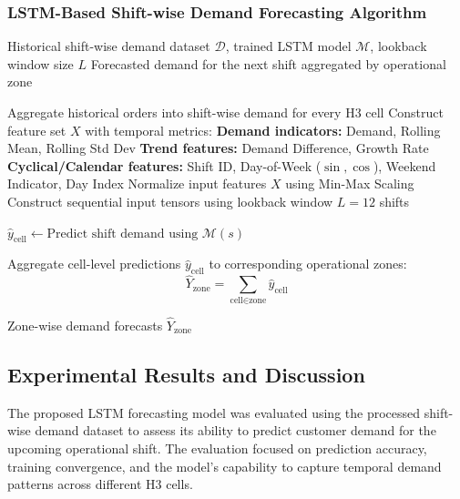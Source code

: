 \documentclass{article}
\begin{document}
\subsubsection{LSTM-Based Shift-wise Demand Forecasting Algorithm}
\begin{algorithm}[H]
\caption{LSTM-Based Shift-Wise Demand Forecasting}
\label{alg:lstm_demand_forecasting}
\begin{algorithmic}[1]
\Require Historical shift-wise demand dataset $\mathcal{D}$, trained LSTM model $\mathcal{M}$, lookback window size $L$
\Ensure Forecasted demand for the next shift aggregated by operational zone

\State Aggregate historical orders into shift-wise demand for every H3 cell
\State Construct feature set $X$ with temporal metrics:
    \Statex \hspace{\algorithmicindent}\textbf{Demand indicators:} Demand, Rolling Mean, Rolling Std Dev
    \Statex \hspace{\algorithmicindent}\textbf{Trend features:} Demand Difference, Growth Rate
    \Statex \hspace{\algorithmicindent}\textbf{Cyclical/Calendar features:} Shift ID, Day-of-Week ($\sin, \cos$), Weekend Indicator, Day Index
\State Normalize input features $X$ using Min-Max Scaling
\State Construct sequential input tensors using lookback window $L = 12$ shifts

    \State $\hat{y}_{\text{cell}} \gets \text{Predict shift demand using } \mathcal{M}(s)$
\EndFor

\State Aggregate cell-level predictions $\hat{y}_{\text{cell}}$ to corresponding operational zones:
    $$\hat{Y}_{\text{zone}} = \sum_{\text{cell} \in \text{zone}} \hat{y}_{\text{cell}}$$

\State \Return Zone-wise demand forecasts $\hat{Y}_{\text{zone}}$
\end{algorithmic}
\end{algorithm}

\subsection{Experimental Results and Discussion}
\label{subsec:experimental_results_and_discussion}

The proposed LSTM forecasting model was evaluated using the processed shift-wise demand dataset to assess its ability to predict customer demand for the upcoming operational shift. The evaluation focused on prediction accuracy, training convergence, and the model's capability to capture temporal demand patterns across different H3 cells.
\end{document}
